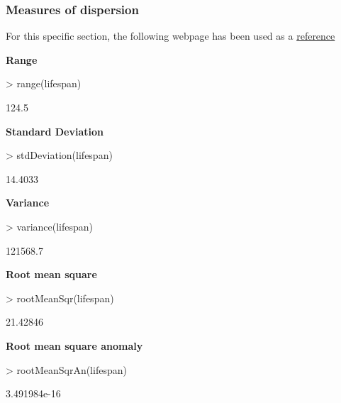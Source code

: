 \documentclass[a4paper]{article}
\begin{document}

\subsubsection*{Measures of dispersion}

For this specific section, the following webpage has been used as a \href{http://iridl.ldeo.columbia.edu/dochelp/StatTutorial/Dispersion/index.html#Intro}{reference}


\textbf{Range}

\begin{Schunk}
\begin{Sinput}
> range(lifespan)
\end{Sinput}
\begin{Soutput}
[1] 124.5
\end{Soutput}
\end{Schunk}


\textbf{Standard Deviation}
\begin{Schunk}
\begin{Sinput}
> stdDeviation(lifespan)
\end{Sinput}
\begin{Soutput}
[1] 14.4033
\end{Soutput}
\end{Schunk}


\textbf{Variance}
\begin{Schunk}
\begin{Sinput}
> variance(lifespan)
\end{Sinput}
\begin{Soutput}
[1] 121568.7
\end{Soutput}
\end{Schunk}


\textbf{Root mean square}
\begin{Schunk}
\begin{Sinput}
> rootMeanSqr(lifespan)
\end{Sinput}
\begin{Soutput}
[1] 21.42846
\end{Soutput}
\end{Schunk}


\textbf{Root mean square anomaly}

\begin{Schunk}
\begin{Sinput}
> rootMeanSqrAn(lifespan)
\end{Sinput}
\begin{Soutput}
[1] 3.491984e-16
\end{Soutput}
\end{Schunk}
\end{document}

